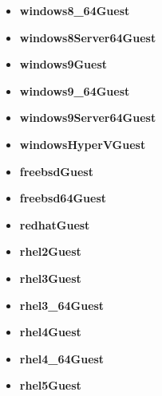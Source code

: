 \begin{itemize}
\item \textbf{windows8\_64Guest} 
\end{itemize}
\begin{itemize}
\item \textbf{windows8Server64Guest} 
\end{itemize}
\begin{itemize}
\item \textbf{windows9Guest} 
\end{itemize}
\begin{itemize}
\item \textbf{windows9\_64Guest} 
\end{itemize}
\begin{itemize}
\item \textbf{windows9Server64Guest} 
\end{itemize}
\begin{itemize}
\item \textbf{windowsHyperVGuest} 
\end{itemize}
\begin{itemize}
\item \textbf{freebsdGuest} 
\end{itemize}
\begin{itemize}
\item \textbf{freebsd64Guest} 
\end{itemize}
\begin{itemize}
\item \textbf{redhatGuest} 
\end{itemize}
\begin{itemize}
\item \textbf{rhel2Guest} 
\end{itemize}
\begin{itemize}
\item \textbf{rhel3Guest} 
\end{itemize}
\begin{itemize}
\item \textbf{rhel3\_64Guest} 
\end{itemize}
\begin{itemize}
\item \textbf{rhel4Guest} 
\end{itemize}
\begin{itemize}
\item \textbf{rhel4\_64Guest} 
\end{itemize}
\begin{itemize}
\item \textbf{rhel5Guest} 
\end{itemize}
